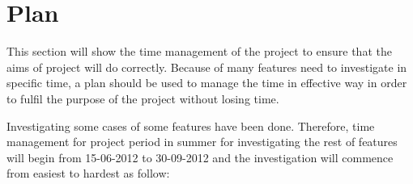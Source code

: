 \documentclass[11pt]{report}
\begin{document}
\section{Plan}
\label{section: plan}

This section will show the time management of the project to ensure that the aims of project will do correctly.  Because of many features need to investigate in specific time, a plan should be used to manage the time in effective way in order to fulfil the purpose of the project without losing time.

Investigating some cases of some features have been done. Therefore, time management for project period in summer for investigating the rest of features will begin from 15-06-2012 to 30-09-2012 and the investigation will commence from easiest to hardest as follow:
\end{document}
